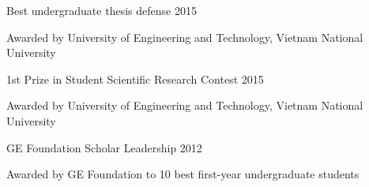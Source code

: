 \begin{cvhonors}
  \cvhonorr
    {Best undergraduate thesis defense} %
    {2015} %
    {
    \begin{cvitems} %
        \item {Awarded by University of Engineering and Technology, Vietnam National University}
      \end{cvitems}
    }

  \cvhonorr
    {1st Prize in Student Scientific Research Contest} %
    {2015} %
    {
    \begin{cvitems} %
        \item {Awarded by University of Engineering and Technology, Vietnam National University}
      \end{cvitems}
    }

  \cvhonorr
    {GE Foundation Scholar Leadership} %
    {2012} %
    {
    \begin{cvitems} %
        \item {Awarded by GE Foundation to 10 best first-year undergraduate students}
      \end{cvitems}
    }

\end{cvhonors}







